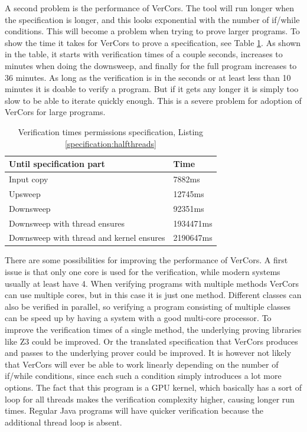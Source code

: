 \documentclass[a4paper]{article}
\begin{document}
A second problem is the performance of VerCors. The tool will run longer when the specification is longer, and this looks exponential with the number of if/while conditions. This will become a problem when trying to prove larger programs. To show the time it takes for VerCors to prove a specification, see Table \ref{table:runTimes}. As shown in the table, it starts with verification times of a couple seconds, increases to minutes when doing the downsweep, and finally for the full program increases to 36 minutes. As long as the verification is in the seconds or at least less than 10 minutes it is doable to verify a program. But if it gets any longer it is simply too slow to be able to iterate quickly enough. This is a severe problem for adoption of VerCors for large programs.

\begin{table}[ht]
	\centering \caption{Verification times permissions specification, Listing \ref{specification:halfthreads}}
	\begin{tabular}{p{80mm}p{20mm}} \hline
		\textbf{Until specification part} & \textbf{Time}\\\hline
		Input copy & 7882ms\\\hline
		Upsweep & 12745ms\\\hline
		Downsweep & 92351ms\\\hline
		Downsweep with thread ensures & 1934471ms\\\hline
		Downsweep with thread and kernel ensures & 2190647ms\\\hline
	\end{tabular}
	\label{table:runTimes}
\end{table}

There are some possibilities for improving the performance of VerCors. A first issue is that only one core is used for the verification, while modern systems usually at least have 4. When verifying programs with multiple methods VerCors can use multiple cores, but in this case it is just one method. Different classes can also be verified in parallel, so verifying a program consisting of multiple classes can be speed up by having a system with a good multi-core processor. To improve the verification times of a single method, the underlying proving libraries like Z3 could be improved. Or the translated specification that VerCors produces and passes to the underlying prover could be improved. It is however not likely that VerCors will ever be able to work linearly depending on the number of if/while conditions, since each such a condition simply introduces a lot more options. The fact that this program is a GPU kernel, which basically has a sort of loop for all threads makes the verification complexity higher, causing longer run times. Regular Java programs will have quicker verification because the additional thread loop is absent.
\end{document}
